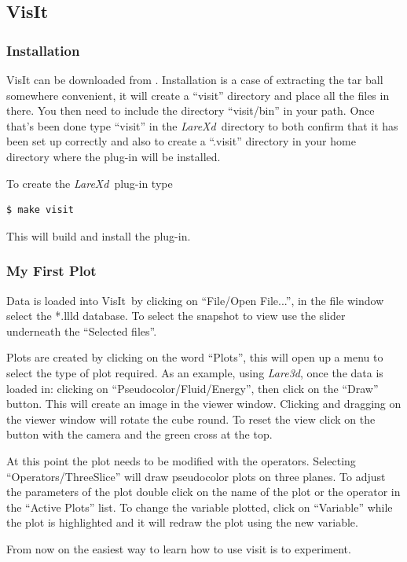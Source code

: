 \documentclass[11pt]{article}
\newcommand{\lare}{{\it LareXd}\ }
\newcommand{\visit}{VisIt\ }
\begin{document}
\subsection{VisIt}
\subsubsection{Installation}
VisIt can be downloaded from \cite{visit}. Installation is a case of extracting the tar ball somewhere convenient, it will create a ``visit'' directory and place all the files in there. You then need to include the directory ``visit/bin'' in your path. Once that's been done type ``visit'' in the \lare directory to both confirm that it has been set up correctly and also to create a ``.visit'' directory in your home directory where the plug-in will be installed.

To create the \lare plug-in type
\begin{verbatim}
$ make visit
\end{verbatim}

This will build and install the plug-in.

\subsubsection{My First Plot}
Data is loaded into \visit by clicking on ``File/Open File...'', in the file window select the *.llld database. To select the snapshot to view use the slider underneath the ``Selected files''. 

Plots are created by clicking on the word ``Plots'', this will open up a menu to select the type of plot required. As an example, using {\it Lare3d}, once the data is loaded in: clicking on ``Pseudocolor/Fluid/Energy'', then click on the ``Draw'' button. This will create an image in the viewer window. Clicking and dragging on the viewer window will rotate the cube round. To reset the view click on the button  with the camera and the green cross at the top. 

At this point the plot needs to be modified with the operators. Selecting ``Operators/ThreeSlice'' will draw pseudocolor plots on three planes. To adjust the parameters of the plot double click on the name of the plot or the operator in the ``Active Plots'' list. To change the variable plotted, click on ``Variable'' while the plot is highlighted and it will redraw the plot using the new variable.

From now on the easiest way to learn how to use visit is to experiment.
\end{document}
